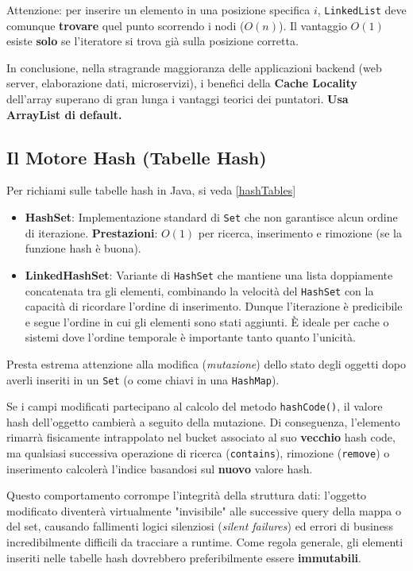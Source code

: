\begin{warningbox}[]
Attenzione: per inserire un elemento in una posizione specifica $i$, \texttt{LinkedList} deve comunque \textbf{trovare} quel punto scorrendo i nodi ($O(n)$). Il vantaggio $O(1)$ esiste \textbf{solo} se l'iteratore si trova già sulla posizione corretta.
\end{warningbox}

In conclusione, nella stragrande maggioranza delle applicazioni backend (web server, elaborazione dati, microservizi), i benefici della \textbf{Cache Locality} dell'array superano di gran lunga i vantaggi teorici dei puntatori. \textbf{Usa ArrayList di default.}

\subsection{Il Motore Hash (Tabelle Hash)}
Per richiami sulle tabelle hash in Java, si veda \ref{hashTables}
\begin{itemize}
    \item \textbf{HashSet}: Implementazione standard di \texttt{Set} che non garantisce alcun ordine di iterazione. \textbf{Prestazioni}: $O(1)$ per ricerca, inserimento e rimozione (se la funzione hash è buona).
    \item \textbf{LinkedHashSet}: Variante di \texttt{HashSet} che mantiene una lista doppiamente concatenata tra gli elementi, combinando la velocità del \texttt{HashSet} con la capacità di ricordare l'ordine di inserimento. Dunque l'iterazione è predicibile e segue l'ordine in cui gli elementi sono stati aggiunti. È ideale per cache o sistemi dove l'ordine temporale è importante tanto quanto l'unicità.
\end{itemize}

\begin{danger}
Presta estrema attenzione alla modifica (\textit{mutazione}) dello stato degli oggetti dopo averli inseriti in un \texttt{Set} (o come chiavi in una \texttt{HashMap}). 

Se i campi modificati partecipano al calcolo del metodo \texttt{hashCode()}, il valore hash dell'oggetto cambierà a seguito della mutazione. Di conseguenza, l'elemento rimarrà fisicamente intrappolato nel bucket associato al suo \textbf{vecchio} hash code, ma qualsiasi successiva operazione di ricerca (\texttt{contains}), rimozione (\texttt{remove}) o inserimento calcolerà l'indice basandosi sul \textbf{nuovo} valore hash. 

Questo comportamento corrompe l'integrità della struttura dati: l'oggetto modificato diventerà virtualmente "invisibile" alle successive query della mappa o del set, causando fallimenti logici silenziosi (\textit{silent failures}) ed errori di business incredibilmente difficili da tracciare a runtime. Come regola generale, gli elementi inseriti nelle tabelle hash dovrebbero preferibilmente essere \textbf{immutabili}.
\end{danger}

